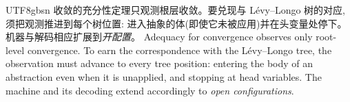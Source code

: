 \begin{CJK*}{UTF8}{gbsn}
\ifPaperChinese
收敛的充分性定理只观测根层收敛。要兑现与 Lévy--Longo 树的对应,须把观测推进到每个树位置:
进入抽象的体(即使它未被应用)并在头变量处停下。机器与解码相应扩展到\emph{开配置}。
\else
Adequacy for convergence observes only root-level convergence. To earn
the correspondence with the Lévy--Longo tree, the observation must
advance to every tree position: entering the body of an abstraction
even when it is unapplied, and stopping at head variables. The
machine and its decoding extend accordingly to \emph{open
configurations}.
\fi


\end{CJK*}
